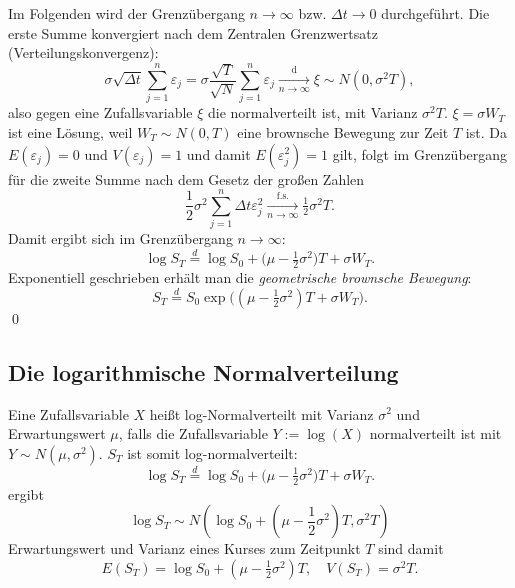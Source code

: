 Im Folgenden wird der Grenzübergang $n \longrightarrow \infty$ bzw. $\Delta t \longrightarrow 0$ durchgeführt. 
Die erste Summe konvergiert nach dem Zentralen Grenzwertsatz (Verteilungskonvergenz):
$$
\sigma \sqrt{\Delta t} \sum_{j=1}^n \varepsilon_j = \sigma \frac{\sqrt{T}}{\sqrt{N}} \sum_{j=1}^n \varepsilon_j  \xrightarrow[n \to \infty]{\mathrm{d}} \xi \sim N(0, \sigma^2 T),
$$
also gegen eine Zufallsvariable $\xi$ die normalverteilt ist, mit Varianz $\sigma^2 T$.  $\xi = \sigma W_T$ ist eine Lösung, 
weil $W_T \sim N(0, T)$ eine brownsche Bewegung zur Zeit $T$ ist. 
Da $E(\varepsilon_j)=0$ und $V(\varepsilon_j)=1$ und damit $E(\varepsilon_j^2) = 1$ gilt, folgt im Grenzübergang für die zweite Summe nach dem Gesetz der großen Zahlen
$$
\frac{1}{2} \sigma^2 \sum_{j=1}^{n} \Delta t \varepsilon_j^2  \xrightarrow[n \to \infty]{\mathrm{f.s.}} \tfrac12 \sigma^2 T.
$$
Damit ergibt sich im Grenzübergang $n \to \infty$:
$$
\log S_T \overset{d} = \log S_0 + \big(\mu - \tfrac12 \sigma^2\big)T + \sigma W_T.
$$Exponentiell geschrieben erhält man die \textit{geometrische brownsche Bewegung}:
$$
S_T \overset d = S_0 \exp\!\Big( (\mu - \tfrac12 \sigma^2)T + \sigma W_T \Big).
$$
\qed
\subsection{Die logarithmische Normalverteilung}

Eine Zufallsvariable $X$ heißt log-Normalverteilt mit Varianz $\sigma^2$ und Erwartungswert $\mu$, 
falls die Zufallsvariable $Y := \log(X)$ normalverteilt ist mit $Y \sim N(\mu, \sigma^2)$.
$S_T$ ist somit log-normalverteilt:
$$\log S_T \overset{d} = \log S_0 + \big(\mu - \tfrac12 \sigma^2\big)T + \sigma W_T.$$
ergibt
$$\log S_T \sim N\left( \log S_0 + \left( \mu - \frac{1}{2} \sigma^2 \right)T , \sigma^2 T\right)$$
Erwartungswert und Varianz eines Kurses zum Zeitpunkt $T$ sind damit
$$E(S_T)=\log S_0 + (\mu - \tfrac12 \sigma^2)T, \quad V(S_T)=\sigma^2 T.$$
